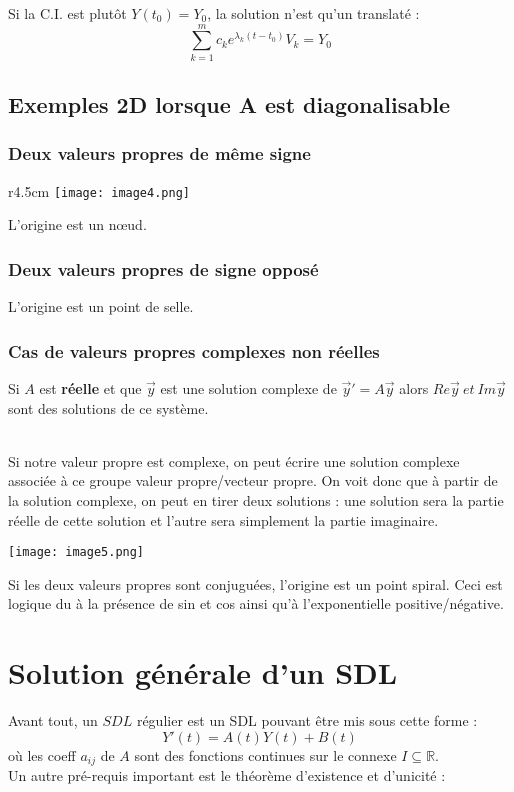 \documentclass[11pt, a4paper, openany]{book}
\begin{document}
Si la C.I. est plutôt $Y(t_0) = Y_0$, la solution n'est qu'un translaté :
\begin{equation}
	\sum_{k=1}^m c_k e^{\lambda_k(t-t_0)} V_k = Y_0
\end{equation}
		
		
\setcounter{subsection}{5}
\subsection{Exemples 2D lorsque A est diagonalisable}
\subsubsection{Deux valeurs propres de même signe}
\begin{wrapfigure}[7]{r}{4.5cm}
	\texttt{[image: image4.png]}
\end{wrapfigure}
L'origine est un nœud.
		
\subsubsection{Deux valeurs propres de signe opposé}
L'origine est un point de selle.
		
\subsubsection{Cas de valeurs propres complexes non réelles}
Si $A$ est \textbf{réelle} et que $\vec y$ est une solution complexe de $\vec y' = A\vec y$ alors $Re\vec{y}\ et\ Im\vec{y}$ sont des solutions de ce système.\\ \
		
Si notre valeur propre est complexe, on peut écrire une solution complexe associée à ce groupe valeur propre/vecteur propre. On voit donc que à partir de la solution complexe, on peut en tirer deux solutions : une solution sera la partie réelle de cette solution et l'autre sera simplement la partie imaginaire.
\begin{center}
	\texttt{[image: image5.png]}
\end{center}
Si les deux valeurs propres sont conjuguées, l'origine est un point spiral. Ceci est logique du à la présence de sin et cos ainsi qu'à l'exponentielle positive/négative.
		
		
\setcounter{section}{1}
\section{Solution générale d'un SDL}
Avant tout, un $SDL$ régulier est un SDL pouvant être mis sous cette forme :
\begin{equation}
	Y'(t) = A(t)Y(t) + B(t)
\end{equation}
où les coeff $a_{ij}$ de $A$ sont des fonctions continues sur le connexe $I\subseteq \mathbb{R}$.\\
Un autre pré-requis important est le théorème d'existence et d'unicité :\\
\end{document}
